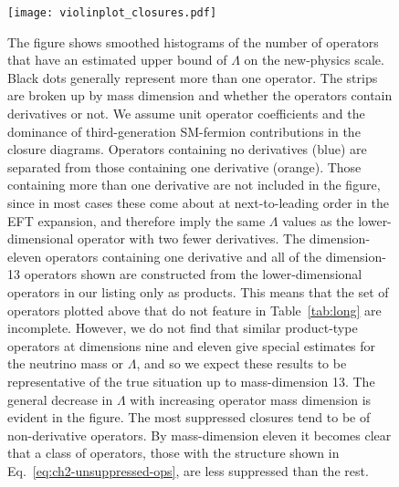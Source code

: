 \begin{figure}
  \centering
  \texttt{[image: violinplot\_closures.pdf]}
  \caption[The figure shows smoothed histograms of the number of operators that
  have an estimated upper bound of $\Lambda$ on the new-physics scale.]{The
    figure shows smoothed histograms of the number of operators that have an
    estimated upper bound of $\Lambda$ on the new-physics scale. Black dots
    generally represent more than one operator. The strips are broken up by mass
    dimension and whether the operators contain derivatives or not. We assume
    unit operator coefficients and the dominance of third-generation SM-fermion
    contributions in the closure diagrams. Operators containing no derivatives
    (blue) are separated from those containing one derivative (orange). Those
    containing more than one derivative are not included in the figure, since in
    most cases these come about at next-to-leading order in the EFT expansion,
    and therefore imply the same $\Lambda$ values as the lower-dimensional
    operator with two fewer derivatives. The dimension-eleven operators
    containing one derivative and all of the dimension-13 operators shown are
    constructed from the lower-dimensional operators in our listing only as
    products. This means that the set of operators plotted above that do not
    feature in Table~\ref{tab:long} are incomplete. However, we do not find that
    similar product-type operators at dimensions nine and eleven give special
    estimates for the neutrino mass or $\Lambda$, and so we expect these results
    to be representative of the true situation up to mass-dimension 13. The
    general decrease in $\Lambda$ with increasing operator mass dimension is
    evident in the figure. The most suppressed closures tend to be of
    non-derivative operators. By mass-dimension eleven it becomes clear that a
    class of operators, those with the structure shown in
    Eq.~\eqref{eq:ch2-unsuppressed-ops}, are less suppressed than the rest.}
  \label{fig:ch2-violinplot-closures}
\end{figure}

